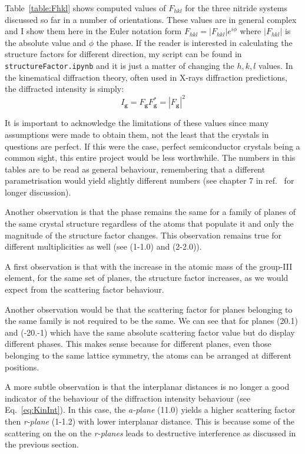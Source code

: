 %
Table~\ref{table:Fhkl} shows computed values of $F_{hkl}$ for the three nitride systems discussed so far in a number of orientations. These values are in general complex and I show them here in the Euler notation form $F_{hkl}=|F_{hkl}| e^{i\phi}$ where $|F_{hkl}|$ is the absolute value and $\phi$ the phase.  If the reader is interested in calculating the structure factors for different direction, my script can be found in \texttt{structureFactor.ipynb} and it is just a matter of changing the $h, k, l$ values. In the kinematical diffraction theory, often used in X-rays diffraction predictions, the diffracted intensity is simply:
\begin{equation}
\label{eq:KinInt}
 I_\mathbf{g} = F_\mathbf{g} F^*_\mathbf{g} =|F_\mathbf{g}|^2   
\end{equation}


It is important to acknowledge the limitations of these values since many assumptions were made to obtain them, not the least that the crystals in questions are perfect. If this were the case, perfect semiconductor crystals being a common sight, this entire project would be less worthwhile. The numbers in this tables are to be read as general behaviour, remembering that a different parametrisation would yield slightly different numbers (see chapter 7 in ref.~\cite{TheoryandPractice} for longer discussion).



Another observation is that the phase remains the same for a family of planes of the same crystal structure regardless of the atoms that populate it and only the magnitude of the structure factor changes. This observation remains true for different multiplicities as well (see \hkl(1-1.0) and \hkl(2-2.0)).

A first observation is that with the increase in the atomic mass of the group-III element, for the same set of planes, the structure factor increases, as we would expect from the scattering factor behaviour. 

Another observation would be that the scattering factor for planes belonging to the same family is not required to be the same. We can see that for planes \hkl(20.1) and \hkl(-20.-1) which have the same absolute scattering factor value but do display different phases. This makes sense because for different planes, even those belonging to the same lattice symmetry, the atoms can be arranged at different positions. 


A more subtle observation is that the interplanar distances is no longer a good indicator of the behaviour of the diffraction intensity behaviour (see Eq.~\ref{eq:KinInt}). In this case, the \textit{a-plane} \hkl(11.0) yields a higher scattering factor then \textit{r-plane} \hkl(1-1.2) with lower interplanar distance. This is because some of the scattering on the on the \textit{r-planes} leads to destructive interference as discussed in the previous section. 


